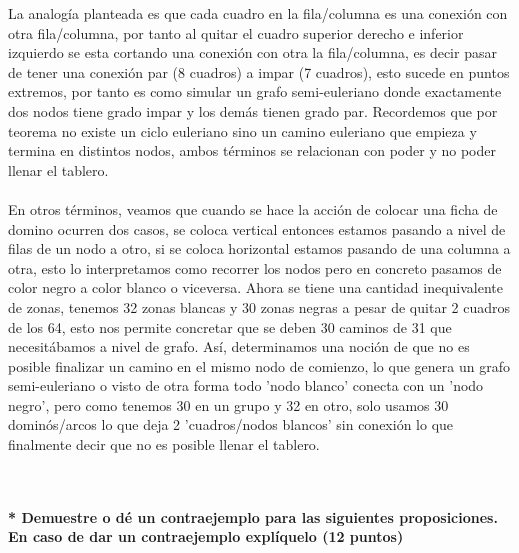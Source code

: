 \documentclass[a4paper,12pt]{article}
\begin{document}
\begin{enumerate}
\begin{flushleft}

\end{flushleft}
La analogía planteada es que cada cuadro en la fila/columna es una conexión con otra fila/columna, por tanto al quitar el cuadro superior derecho e inferior izquierdo se esta cortando una conexión con otra la fila/columna, es decir pasar de tener una conexión par (8 cuadros) a impar (7 cuadros), esto sucede en puntos extremos, por tanto es como simular un grafo semi-euleriano donde exactamente dos nodos tiene grado impar y los demás tienen grado par. Recordemos que por teorema no existe un ciclo euleriano sino un camino euleriano que empieza y termina en distintos nodos, ambos términos se relacionan con poder y no poder llenar el tablero. \\
$~~$ \\
En otros términos, veamos que cuando se hace la acción de colocar una ficha de domino ocurren dos casos, se coloca vertical entonces estamos pasando a nivel de filas de un nodo a otro, si se coloca horizontal estamos pasando de una columna a otra, esto lo interpretamos como recorrer los nodos pero en concreto pasamos de color negro a color blanco o viceversa. Ahora se tiene una cantidad inequivalente de zonas, tenemos 32 zonas blancas y 30 zonas negras a pesar de quitar 2 cuadros de los 64, esto nos permite concretar que se deben 30 caminos de 31 que necesitábamos a nivel de grafo. Así, determinamos una noción de que no es posible finalizar un camino en el mismo nodo de comienzo, lo que genera un grafo semi-euleriano o visto de otra forma todo 'nodo blanco' conecta con un 'nodo negro', pero como tenemos 30 en un grupo y 32 en otro, solo usamos 30 dominós/arcos lo que deja 2 'cuadros/nodos blancos' sin conexión lo que finalmente decir que no es posible llenar el tablero. 

\end{enumerate}
 $~~$ \\
 $~~$ \\
 \textbf{ * Demuestre o dé un contraejemplo para las siguientes proposiciones. En caso de dar un contraejemplo explíquelo (12 puntos)}
\end{document}
